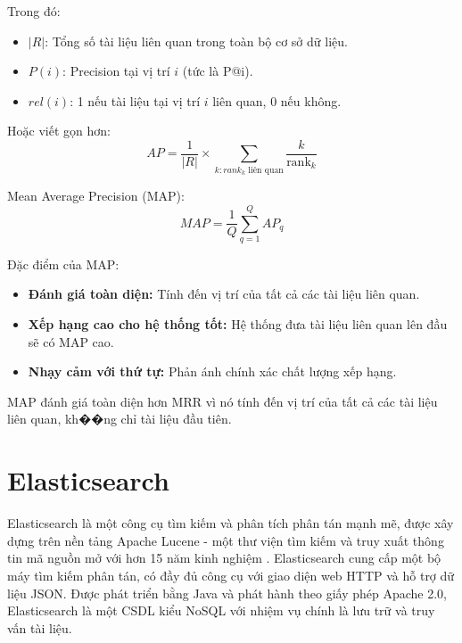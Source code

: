 \documentclass[../BTL.tex]{subfiles}
\begin{document}
Trong đó:
\begin{itemize}
    \item $|R|$: Tổng số tài liệu liên quan trong toàn bộ cơ sở dữ liệu.
    
    \item $P(i)$: Precision tại vị trí $i$ (tức là P@i).
    
    \item $rel(i)$: 1 nếu tài liệu tại vị trí $i$ liên quan, 0 nếu không.
\end{itemize}

Hoặc viết gọn hơn:
$$
AP = \frac{1}{|R|} \times \sum_{k: rank_k \text{ liên quan}} \frac{k}{\text{rank}_k}
$$

Mean Average Precision (MAP):
$$
MAP = \frac{1}{Q}\sum_{q=1}^{Q} AP_q
$$

Đặc điểm của MAP:
\begin{itemize}
    \item \textbf{Đánh giá toàn diện:} Tính đến vị trí của tất cả các tài liệu liên quan.
    
    \item \textbf{Xếp hạng cao cho hệ thống tốt:} Hệ thống đưa tài liệu liên quan lên đầu sẽ có MAP cao.
    
    \item \textbf{Nhạy cảm với thứ tự:} Phản ánh chính xác chất lượng xếp hạng.
\end{itemize}

MAP đánh giá toàn diện hơn MRR vì nó tính đến vị trí của tất cả các tài liệu liên quan, kh��ng chỉ tài liệu đầu tiên.

\section{Elasticsearch}
Elasticsearch là một công cụ tìm kiếm và phân tích phân tán mạnh mẽ, được xây dựng trên nền tảng Apache Lucene - một thư viện tìm kiếm và truy xuất thông tin mã nguồn mở với hơn 15 năm kinh nghiệm \cite{elasticsearch}. Elasticsearch cung cấp một bộ máy tìm kiếm phân tán, có đầy đủ công cụ với giao diện web HTTP và hỗ trợ dữ liệu JSON. Được phát triển bằng Java và phát hành theo giấy phép Apache 2.0, Elasticsearch là một CSDL kiểu NoSQL với nhiệm vụ chính là lưu trữ và truy vấn tài liệu.
\end{document}
